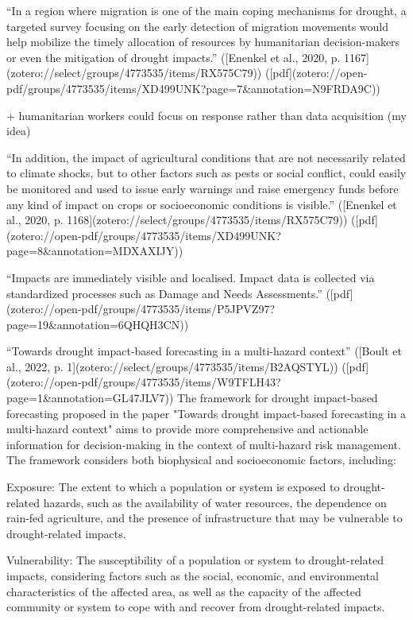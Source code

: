{“In a region where migration is one of the main coping mechanisms for drought, a targeted survey focusing on the early detection of migration movements would help mobilize the timely allocation of resources by humanitarian decision-makers or even the mitigation of drought impacts.” ([Enenkel et al., 2020, p. 1167](zotero://select/groups/4773535/items/RX575C79)) ([pdf](zotero://open-pdf/groups/4773535/items/XD499UNK?page=7&annotation=N9FRDA9C))

+ humanitarian workers could focus on response rather than data acquisition (my idea)

“In addition, the impact of agricultural conditions that are not necessarily related to climate shocks, but to other factors such as pests or social conflict, could easily be monitored and used to issue early warnings and raise emergency funds before any kind of impact on crops or socioeconomic conditions is visible.” ([Enenkel et al., 2020, p. 1168](zotero://select/groups/4773535/items/RX575C79)) ([pdf](zotero://open-pdf/groups/4773535/items/XD499UNK?page=8&annotation=MDXAXIJY))

“Impacts are immediately visible and localised. Impact data is collected via standardized processes such as Damage and Needs Assessments.” ([pdf](zotero://open-pdf/groups/4773535/items/P5JPVZ97?page=19&annotation=6QHQH3CN))



“Towards drought impact-based forecasting in a multi-hazard context” ([Boult et al., 2022, p. 1](zotero://select/groups/4773535/items/B2AQSTYL)) ([pdf](zotero://open-pdf/groups/4773535/items/W9TFLH43?page=1&annotation=GL47JLV7))
The framework for drought impact-based forecasting proposed in the paper "Towards drought impact-based forecasting in a multi-hazard context" aims to provide more comprehensive and actionable information for decision-making in the context of multi-hazard risk management. The framework considers both biophysical and socioeconomic factors, including:

Exposure: The extent to which a population or system is exposed to drought-related hazards, such as the availability of water resources, the dependence on rain-fed agriculture, and the presence of infrastructure that may be vulnerable to drought-related impacts.

Vulnerability: The susceptibility of a population or system to drought-related impacts, considering factors such as the social, economic, and environmental characteristics of the affected area, as well as the capacity of the affected community or system to cope with and recover from drought-related impacts.

}
